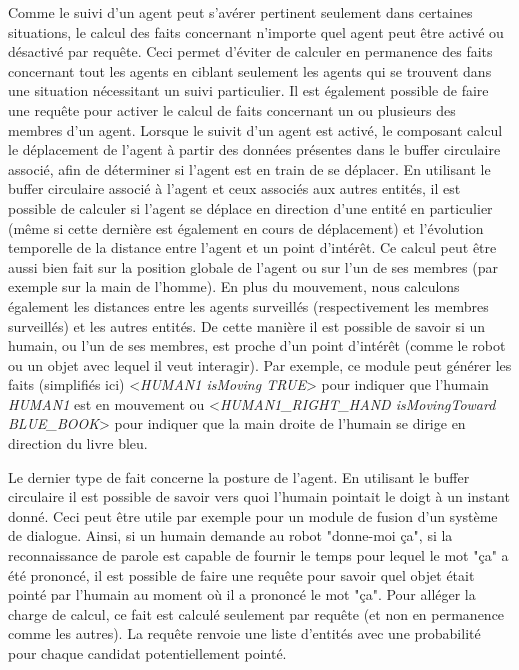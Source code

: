\documentclass[a4paper,11pt,twoside]{StyleThese}
\begin{document}
Comme le suivi d'un agent peut s'avérer pertinent seulement dans certaines situations, le calcul des faits concernant n'importe quel agent peut être activé ou désactivé par requête. Ceci permet d'éviter de calculer en permanence des faits concernant tout les agents en ciblant seulement les agents qui se trouvent dans une situation nécessitant un suivi particulier.
Il est également possible de faire une requête pour activer le calcul de faits concernant un ou plusieurs des membres d'un agent. Lorsque le suivit d'un agent est activé, le composant calcul le déplacement de l'agent à partir des données présentes dans le buffer circulaire associé, afin de déterminer si l'agent est en train de se déplacer. En utilisant le buffer circulaire associé à l'agent et ceux associés aux autres entités, il est possible de calculer si l'agent se déplace en direction d'une entité en particulier (même si cette dernière est également en cours de déplacement) et l'évolution temporelle de la distance entre l'agent et un point d'intérêt. Ce calcul peut être aussi bien fait sur la position globale de l'agent ou sur l'un de ses membres (par exemple sur la main de l'homme).
En plus du mouvement, nous calculons également les distances entre les agents surveillés (respectivement les membres surveillés) et les autres entités.
De cette manière il est possible de savoir si un humain, ou l'un de ses membres, est proche d'un point d'intérêt (comme le robot ou un objet avec lequel il veut interagir).
Par exemple, ce module peut générer les faits (simplifiés ici) <\textit{HUMAN1 isMoving TRUE}> pour indiquer que l'humain \textit{HUMAN1} est en mouvement ou <\textit{HUMAN1\_RIGHT\_HAND isMovingToward BLUE\_BOOK}> pour indiquer que la main droite de l'humain se dirige en direction du livre bleu.

Le dernier type de fait concerne la posture de l'agent. En utilisant le buffer circulaire il est possible de savoir vers quoi l'humain pointait le doigt à un instant donné. Ceci peut être utile par exemple pour un module de fusion d'un système de dialogue. Ainsi, si un humain demande au robot "donne-moi ça", si la reconnaissance de parole est capable de fournir le temps pour lequel le mot "ça" a été prononcé, il est possible de faire une requête pour savoir quel objet était pointé par l'humain au moment où il a prononcé le mot "ça". Pour alléger la charge de calcul, ce fait est calculé seulement par requête (et non en permanence comme les autres). La requête renvoie une liste d'entités avec une probabilité pour chaque candidat potentiellement pointé.
\end{document}
